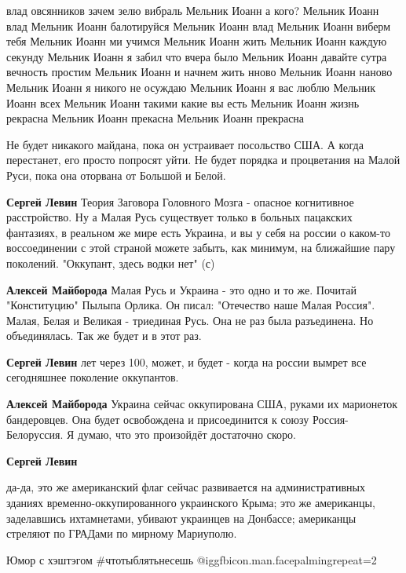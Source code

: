 \begin{itemize}

\obeycr
влад овсянников
зачем зелю вибраль
Мельник Иоанн
а кого?
Мельник Иоанн
влад
Мельник Иоанн
балотируйся
Мельник Иоанн
влад
Мельник Иоанн
виберм тебя
Мельник Иоанн
ми учимся
Мельник Иоанн
жить
Мельник Иоанн
каждую секунду
Мельник Иоанн
я забил что вчера было
Мельник Иоанн
давайте сутра вечность простим
Мельник Иоанн
и начнем жить нново
Мельник Иоанн
наново
Мельник Иоанн
я никого не осуждаю
Мельник Иоанн
я вас люблю
Мельник Иоанн
всех
Мельник Иоанн
такими какие вы есть
Мельник Иоанн
жизнь рекрасна
Мельник Иоанн
прекасна
Мельник Иоанн
прекрасна
\restorecr


Не будет никакого майдана, пока он устраивает посольство США. А когда
перестанет, его просто попросят уйти.  Не будет порядка и процветания на Малой
Руси, пока она оторвана от Большой и Белой.

\begin{itemize} %
\textbf{Сергей Левин} Теория Заговора Головного Мозга - опасное когнитивное расстройство.
Ну а Малая Русь существует только в больных пацакских фантазиях, в реальном же мире есть Украина, и вы у себя на россии о каком-то воссоединении с этой страной можете забыть, как минимум, на ближайшие пару поколений.
"Оккупант, здесь водки нет" (с)

\textbf{Алексей Майборода} Малая Русь и Украина - это одно и то же. Почитай "Конституцию" Пылыпа Орлика. Он писал: "Отечество наше Малая Россия".
Малая, Белая и Великая - триединая Русь. Она не раз была разъединена. Но объединялась. Так же будет и в этот раз.

\textbf{Сергей Левин} лет через 100, может, и будет - когда на россии вымрет все сегодняшнее поколение оккупантов.

\textbf{Алексей Майборода} Украина сейчас оккупирована США, руками их марионеток бандеровцев. Она будет освобождена и присоединится к союзу Россия-Белоруссия. Я думаю, что это произойдёт достаточно скоро.

\textbf{Сергей Левин} 

да-да, это же американский флаг сейчас развивается на административных зданиях
временно-оккупированного украинского Крыма; это же американцы, заделавшись
ихтамнетами, убивают украинцев на Донбассе; американцы стреляют по ГРАДами по
мирному Мариуполю.

Юмор с хэштэгом \#чтотыблятьнесешь
 @igg{fbicon.man.facepalming}{repeat=2} 


\end{itemize}
\end{itemize}
